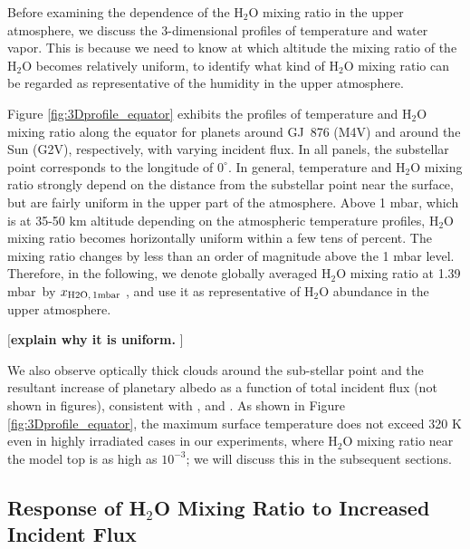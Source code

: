 \documentclass[11pt,numberedappendix,twocolappendix,]{emulateapj}
\def\water{H$_2$O }
\def\xwater{$x_{\rm H2O,\,1mbar}$ }
\def\preslevel{1.39 mbar\ }
\def\memo#1{\color{red}$[${\bf #1}$]$ \color{black}}
\begin{document}
Before examining the dependence of the \water mixing ratio in the upper atmosphere, we discuss the 3-dimensional profiles of temperature and water vapor. 
This is because we need to know at which altitude the mixing ratio of the \water becomes relatively uniform, to identify what kind of \water mixing ratio can be regarded as representative of the humidity in the upper atmosphere. 

Figure \ref{fig:3Dprofile_equator} exhibits the profiles of temperature and \water mixing ratio along the equator for planets around GJ~876 (M4V) and around the Sun (G2V), respectively, with varying incident flux. 
In all panels, the substellar point corresponds to the longitude of $0^{\circ }$. 
In general, temperature and \water mixing ratio strongly depend on the distance from the substellar point near the surface, but are fairly uniform in the upper part of the atmosphere. 
Above 1 mbar, which is at 35-50 km altitude depending on the atmospheric temperature profiles, \water mixing ratio becomes horizontally uniform within a few tens of percent. 
The mixing ratio changes by less than an order of magnitude above the 1 mbar level. 
Therefore, in the following, we denote globally averaged \water mixing ratio at \preslevel  by \xwater, and use it as representative of \water abundance in the upper atmosphere. 

\memo{explain why it is uniform. }

We also observe optically thick clouds around the sub-stellar point and the resultant increase of planetary albedo as a function of total incident flux (not shown in figures), consistent with \citet{Yang2013,Yang2014}, \citet{Kopparapu2016} and \citet{Way2016}. 
As shown in Figure \ref{fig:3Dprofile_equator}, the maximum surface temperature does not exceed 320 K even in highly irradiated cases in our experiments, where \water mixing ratio near the model top is as high as $10^{-3}$; we will discuss this in the subsequent sections. 


\subsection{Response of \water Mixing Ratio to Increased Incident Flux}
\label{ss:result_H2Omixingratio}
\end{document}
